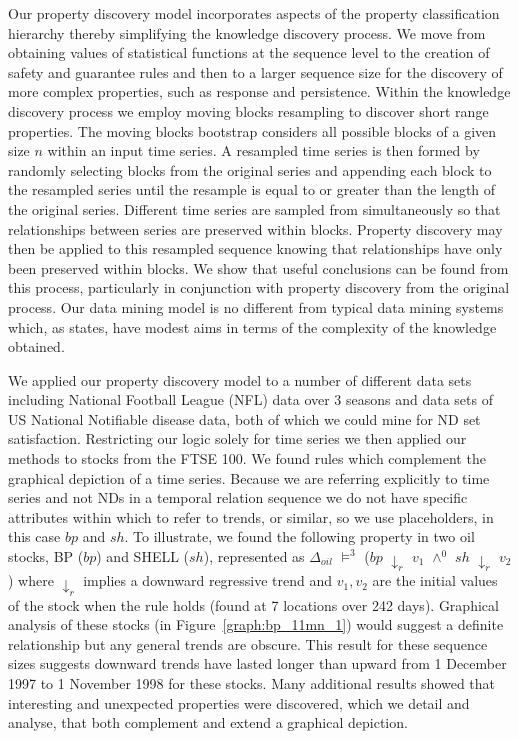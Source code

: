 \medskip

Our property discovery model incorporates aspects of the property
classification hierarchy thereby simplifying the knowledge discovery
process. We move from obtaining values of statistical functions at the
sequence level to the creation of safety and guarantee rules and then
to a larger sequence size for the discovery of more complex
properties, such as response and persistence.
Within the knowledge discovery process we employ moving blocks
resampling to discover short range properties. The moving blocks
bootstrap considers all possible blocks of a given size $n$ within an
input time series. A resampled time series is then formed by randomly
selecting blocks from the original series and appending each block to
the resampled series until the resample is equal to or greater than
the length of the original series.  Different time series are sampled
from simultaneously so that relationships between series are preserved
within blocks. Property discovery may then be
applied to this resampled sequence knowing that relationships have
only been preserved within blocks. We show that useful conclusions can
be found from this process, particularly in conjunction with property
discovery from the original process. Our data mining model is no
different from typical data mining systems which, as \cite{man96}
states, have modest aims in terms of the complexity of the knowledge
obtained. 
\medskip

We applied our property discovery model to a number of different data
sets including National Football League (NFL) data over 3 seasons and data
sets of US National Notifiable disease data, both of which we could
mine for ND set satisfaction. Restricting our logic solely for time
series we then applied our methods to stocks from the FTSE 100. We found
rules which complement the graphical depiction of a time series. Because we
are referring explicitly to time series and not NDs in a temporal
relation sequence we do not have specific attributes within which to refer
to trends, or similar, so we use placeholders, in this case $bp$ and $sh$.
To
illustrate, we found the following property in two oil stocks, BP ($bp$) and
SHELL ($sh$), represented as $\Delta_{oil}$ $\models^3$  ($bp$ $\downarrow_r$ $v_1$
$\wedge^0$ $sh$ $\downarrow_r$ $v_2$) where $\downarrow_r$ implies a downward
regressive trend and $v_1,v_2$ are the initial values of the stock
when the rule holds (found at 7 locations over 242 days). 
 Graphical analysis of these stocks (in Figure~\ref{graph:bp_11mn_1})
would suggest 
a definite relationship but any general trends are obscure. This
result for these sequence
sizes suggests downward trends have lasted longer than upward from 1
December 1997 to 1 November 1998 for these stocks. Many additional results 
showed that interesting and unexpected properties were
discovered, which we detail and analyse, that both complement and
extend a graphical depiction.


